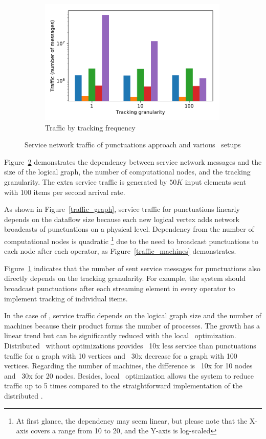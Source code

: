 \begin{figure}[t!]
\begin{subfigure}[t]{0.3\textwidth}
            \includegraphics[width=0.99\textwidth]{Chapters/Tracker/pics/traffic_by_tracking_frequency_bars.pdf}
            \caption{Traffic by tracking frequency}
            \label{traffic_granularity}
    \end{subfigure}
    \caption{Service network traffic of punctuations approach and various \tracker\ setups}
    \label{traffic_plots}
\end{figure}

Figure~\ref{traffic_plots} demonstrates the dependency between service network messages and the size of the logical graph, the number of computational nodes, and the tracking granularity. The extra service traffic is generated by $50K$ input elements sent with 100 items per second arrival rate. 

As shown in Figure~\ref{traffic_graph}, service traffic for punctuations linearly depends on the dataflow size because each new logical vertex adds network broadcasts of punctuations on a physical level. Dependency from the number of computational nodes is quadratic \footnote{At first glance, the dependency may seem linear, but please note that the X-axis covers a range from 10 to 20, and the Y-axis is log-scaled} due to the need to broadcast punctuations to each node after each operator, as Figure~\ref{traffic_machines} demonstrates. 

Figure~\ref{traffic_granularity} indicates that the number of sent service messages for punctuations also directly depends on the tracking granularity. For example, the system should broadcast punctuations after each streaming element in every operator to implement tracking of individual items. 

In the case of \tracker, service traffic depends on the logical graph size and the number of machines because their product forms the number of processes. The growth has a linear trend but can be significantly reduced with the local \tracker\ optimization. Distributed \tracker\ without optimizations provides ~10x less service than punctuations traffic for a graph with 10 vertices and ~30x decrease for a graph with 100 vertices. Regarding the number of machines, the difference is ~10x for 10 nodes and ~30x for 20 nodes. Besides, local \tracker\ optimization allows the system to reduce traffic up to 5 times compared to the straightforward implementation of the distributed \tracker.

